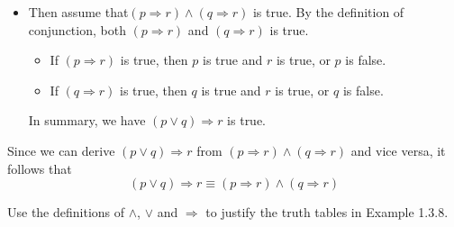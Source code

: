 \begin{solutions*}
\begin{itemize}
\begin{itemize}
            In this case, we have $(p \Rightarrow r) \wedge (q \Rightarrow r)$ is true.
        \end{itemize}
        \item Then assume that$(p \Rightarrow r) \wedge (q \Rightarrow r)$ is true. By the definition of conjunction, both $(p \Rightarrow r)$ and $(q \Rightarrow r)$ is true.
        \begin{itemize}
            \item If $(p \Rightarrow r)$ is true, then $p$ is true and $r$ is true, or $p$ is false.
            \item If $(q \Rightarrow r)$ is true, then $q$ is true and $r$ is true, or $q$ is false.
        \end{itemize}
        In summary, we have $(p \vee q) \Rightarrow r$ is true.
    \end{itemize}
    Since we can derive $(p \vee q) \Rightarrow r$ from $(p \Rightarrow r) \wedge (q \Rightarrow r)$ and vice versa, it follows that
    \[(p \vee q) \Rightarrow r \equiv (p \Rightarrow r) \wedge (q \Rightarrow r)\]
\end{solutions*}

\begin{exercise}
Use the definitions of $\wedge$, $\vee$ and $\Rightarrow$ to justify the truth tables in Example 1.3.8.
\end{exercise}


